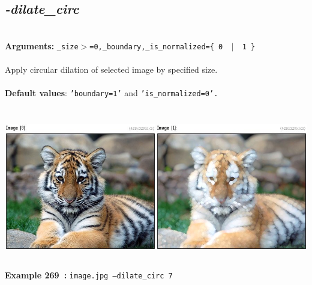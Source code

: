 \documentclass[a4paper,11pt,twoside]{book}
\begin{document}
\subsection{\emph{-dilate\_circ} }\vspace*{-0.5em}
~\\\textbf{Arguments: } 
{\small \texttt{\_size$>$=0,\_boundary,\_is\_normalized=\{ 0 ~$|$~ 1 \}}}\\~\\
Apply circular dilation of selected image by specified size.
~\\~\\\textbf{Default values}: {\small \texttt{'boundary=1'} and \texttt{'is\_normalized=0'.}}
\begin{center}\includegraphics[keepaspectratio=true,height=7cm,width=\textwidth]{img/gmic_def269.jpg}\\
{\footnotesize \textbf{Example 269~:} \texttt{image.jpg --dilate\_circ 7}}
\end{center}
\end{document}
